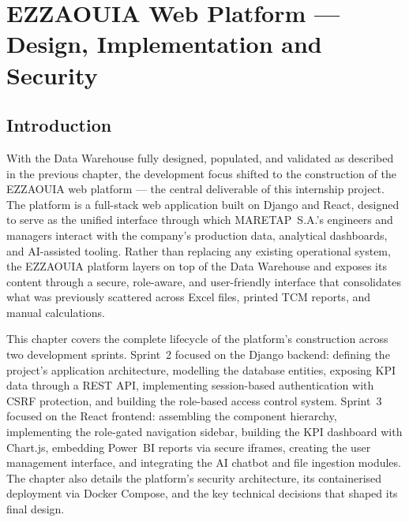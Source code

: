 
\chapter{EZZAOUIA Web Platform --- Design, Implementation and Security}
\label{chap:platform}

\setcounter{section}{0}
\setcounter{figure}{0}
\setcounter{table}{0}

\section{Introduction}
\begin{sloppypar}

With the Data Warehouse fully designed, populated, and validated as described in
the previous chapter, the development focus shifted to the construction of the
EZZAOUIA web platform --- the central deliverable of this internship project.
The platform is a full-stack web application built on Django and React, designed
to serve as the unified interface through which MARETAP~S.A.'s engineers and
managers interact with the company's production data, analytical dashboards, and
AI-assisted tooling. Rather than replacing any existing operational system, the
EZZAOUIA platform layers on top of the Data Warehouse and exposes its content
through a secure, role-aware, and user-friendly interface that consolidates what
was previously scattered across Excel files, printed TCM reports, and manual
calculations.

This chapter covers the complete lifecycle of the platform's construction across
two development sprints. Sprint~2 focused on the Django backend: defining the
project's application architecture, modelling the database entities, exposing KPI
data through a REST API, implementing session-based authentication with CSRF
protection, and building the role-based access control system. Sprint~3 focused
on the React frontend: assembling the component hierarchy, implementing the
role-gated navigation sidebar, building the KPI dashboard with Chart.js,
embedding Power~BI reports via secure iframes, creating the user management
interface, and integrating the AI chatbot and file ingestion modules. The chapter
also details the platform's security architecture, its containerised deployment
via Docker Compose, and the key technical decisions that shaped its final design.

\end{sloppypar}

